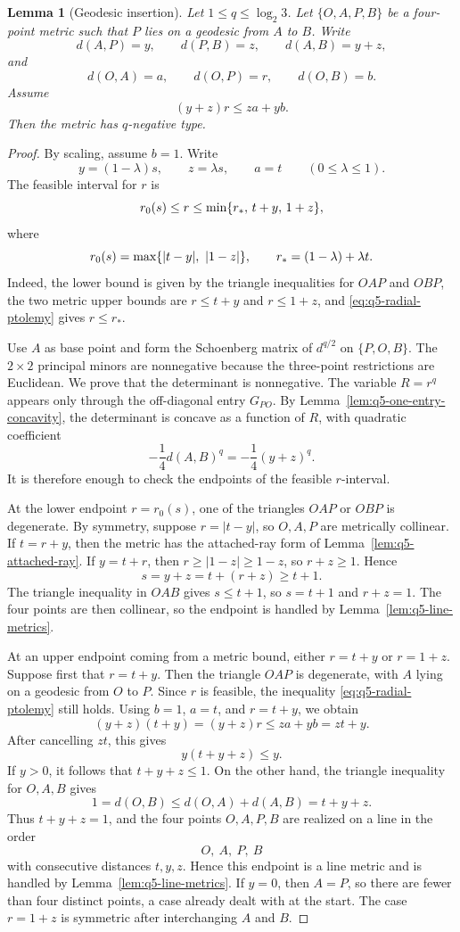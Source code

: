\documentclass[12pt]{amsart}
\newtheorem{lemma}[theorem]{Lemma}
\theoremstyle{definition}
\newcommand{\1}{\mathbf{1}}
\renewcommand\max{\textup{max}}
\renewcommand{\min}{\textup{min}}
\begin{document}
\begin{lemma}[Geodesic insertion]
\label{lem:q5-radial}
Let $1\le q\le\log_2 3$.  Let $\{O,A,P,B\}$ be a four-point metric such that
$P$ lies on a geodesic from $A$ to $B$.  Write
\[
        d(A,P)=y,\qquad d(P,B)=z,\qquad d(A,B)=y+z,
\]
and
\[
        d(O,A)=a,\qquad d(O,P)=r,\qquad d(O,B)=b.
\]
Assume
\[
        (y+z)r\le za+yb.
        \tag{$*$}
        \label{eq:q5-radial-ptolemy}
\]
Then the metric has $q$-negative type.
\end{lemma}

\begin{proof}
By scaling, assume $b=1$.  Write
\[
        y=(1-\lambda)s,\qquad z=\lambda s,\qquad a=t
        \qquad (0\le\lambda\le1).
\]
The feasible interval for $r$ is
\[
        r_0(s)\le r\le \min\{r_*,\,t+y,\,1+z\},
\]
where
\[
        r_0(s)=\max\{|t-y|,\ |1-z|\},
        \qquad
        r_*=(1-\lambda)+\lambda t.
\]
Indeed, the lower bound is given by the triangle inequalities for $OAP$ and $OBP$,
the two metric upper bounds are $r\le t+y$ and $r\le1+z$, and
\eqref{eq:q5-radial-ptolemy} gives $r\le r_*$.

Use $A$ as base point and form the Schoenberg matrix of $d^{q/2}$ on
$\{P,O,B\}$.  The $2\times2$ principal minors are nonnegative because the
three-point restrictions are Euclidean.  We prove that the determinant is nonnegative.
The variable $R=r^q$ appears only through the off-diagonal entry $G_{PO}$.
By Lemma~\ref{lem:q5-one-entry-concavity}, the determinant is concave as a function of
$R$, with quadratic coefficient
\[
        -\frac14 d(A,B)^q=-\frac14(y+z)^q.
\]
It is therefore enough to check the endpoints of the feasible $r$-interval.

At the lower endpoint $r=r_0(s)$, one of the triangles $OAP$ or $OBP$ is
degenerate.  By symmetry, suppose $r=|t-y|$, so $O,A,P$ are metrically collinear.
If $t=r+y$, then the metric has the attached-ray form of
Lemma~\ref{lem:q5-attached-ray}.  If $y=t+r$, then
$r\ge |1-z|\ge 1-z$, so $r+z\ge1$.  Hence
\[
        s=y+z=t+(r+z)\ge t+1.
\]
The triangle inequality in $OAB$ gives $s\le t+1$, so $s=t+1$ and
$r+z=1$.  The four points are then collinear, so the endpoint is handled by
Lemma~\ref{lem:q5-line-metrics}.

At an upper endpoint coming from a metric bound, either $r=t+y$ or $r=1+z$.
Suppose first that $r=t+y$.  Then the triangle $OAP$ is degenerate, with
$A$ lying on a geodesic from $O$ to $P$.  Since $r$ is feasible, the
inequality \eqref{eq:q5-radial-ptolemy} still holds.  Using $b=1$,
$a=t$, and $r=t+y$, we obtain
\[
        (y+z)(t+y)=(y+z)r\le za+yb=zt+y.
\]
After cancelling $zt$, this gives
\[
        y(t+y+z)\le y.
\]
If $y>0$, it follows that $t+y+z\le1$.  On the other hand, the triangle
inequality for $O,A,B$ gives
\[
        1=d(O,B)\le d(O,A)+d(A,B)=t+y+z.
\]
Thus $t+y+z=1$, and the four points $O,A,P,B$ are realized on a line in
the order
\[
        O,\ A,\ P,\ B
\]
with consecutive distances $t,y,z$.  Hence this endpoint is a line metric and
is handled by Lemma~\ref{lem:q5-line-metrics}.  If $y=0$, then $A=P$, so
there are fewer than four distinct points, a case already dealt with at the
start.  The case $r=1+z$ is symmetric after interchanging $A$ and $B$.


\end{proof}
\end{document}
